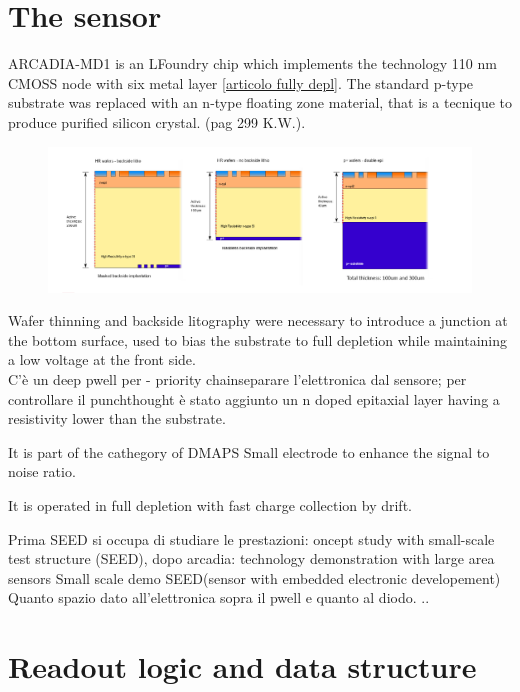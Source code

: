 \section{The sensor}
    ARCADIA-MD1 is an LFoundry chip which implements the technology 110 nm CMOSS node
    with six metal layer \ref{articolo fully depl}.
    The standard p-type substrate was replaced with an n-type floating zone material,
    that is a tecnique to produce purified silicon crystal. (pag 299 K.W.).\\
    \begin{figure}[h!]
        \centering
        \includegraphics[width=.8\linewidth]{figures/ARCADIA/ARCADIA_substrate.png}
        \caption{}
        \label{fig:ARCADIA_substrate}
    \end{figure}

    Wafer thinning and backside litography were necessary to introduce a junction
    at the bottom surface, used to bias the substrate to full depletion while
    maintaining a low voltage at the front side.  \\
    C'è un deep pwell per - priority chainseparare l'elettronica dal sensore; per controllare il punchthought
    è stato aggiunto un n doped epitaxial layer having a resistivity lower than the substrate.



    It is part of the cathegory of DMAPS
    Small electrode to enhance the signal to noise ratio.

    It is operated in full depletion with fast charge collection by drift.

    Prima SEED si occupa di studiare le prestazioni: oncept study with small-scale test structure (SEED),
    dopo arcadia: technology demonstration with large area sensors
    Small scale demo SEED(sensor with embedded electronic developement)
    Quanto spazio dato all'elettronica sopra il pwell e quanto al diodo. ..

\section{Readout logic and data structure}
